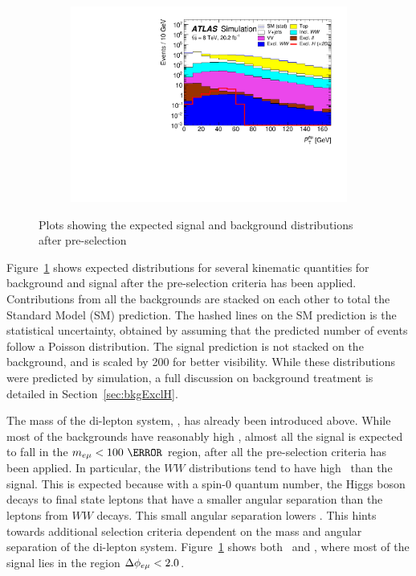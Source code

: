 \begin{figure}[!h]
\begin{subfigure}{0.5\textwidth}
\end{subfigure} 
\begin{subfigure}{0.5\textwidth}
   \includegraphics[width=\textwidth]{figures/emme-CutMll-Ptll-log.pdf}
\end{subfigure} 
\caption{Plots showing the expected signal and background distributions after pre-selection}
\label{fig:preselExclH}
\end{figure}

\par Figure~\ref{fig:preselExclH} shows expected distributions for several kinematic quantities for background 
and signal after the pre-selection criteria has been applied. Contributions from all the backgrounds are stacked on each 
other to total the Standard Model (SM) prediction. The hashed lines on the SM prediction is the statistical 
uncertainty, obtained by assuming that the predicted number of events follow a Poisson distribution. 
The signal prediction is not stacked on the background, and is scaled by 200 for better visibility. 
While these distributions were predicted by simulation, a full discussion on background 
treatment is detailed in Section~\ref{sec:bkgExclH}.

\par The mass of the di-lepton system, \memu, has already been introduced above. While most of the backgrounds 
have reasonably high \memu, almost all the signal is 
expected to fall in the $\memu<100~\GeV$ region, after all the pre-selection criteria has been applied. 
In particular, the $WW$ distributions tend to have high \memu\ than the signal. This is expected because with a 
spin-0 quantum number, the Higgs boson decays to final state leptons that have a smaller angular separation 
than the leptons from $WW$ decays. This small angular separation lowers \memu.   
This hints 
towards additional selection criteria dependent on the mass and angular separation of the di-lepton system.
Figure~\ref{fig:preselExclH} shows both \memu\ and \dFem, where most of the signal lies in the 
region $\Delta\phi_{e\mu}<2.0$.      

